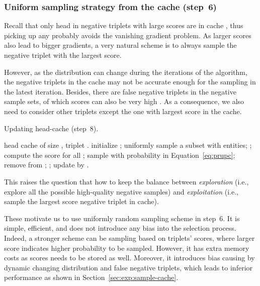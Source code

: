 \documentclass[conference]{IEEEtran}
\begin{document}
\subsubsection{Uniform sampling strategy from the cache (step~6)}
\label{sssec:sample}
Recall that only head  in negative triplets with large scores are in cache ,
thus picking up any  probably avoids the vanishing gradient problem.
As larger scores also lead to bigger gradients,
a very natural scheme is to always sample the negative triplet with the largest score.

However,
as the distribution can change during the iterations of the algorithm,
the negative triplets in the cache may not be accurate enough for the sampling in the latest iteration.
Besides,
there are false negative triplets in the negative sample sets,
of which scores can also be very high \cite{wang2017knowledge}.
As a consequence, 
we also need to consider other triplets except the one with largest score in the cache.


\begin{algorithm}[ht]
	\caption{Updating head-cache (step~8).}
	\label{alg-cache-update}
	\begin{algorithmic}[1]
		\REQUIRE  head cache  of size , triplet .
		\STATE initialize ;
		\STATE uniformly sample a subset  with  entities;
		\STATE ;
\STATE compute the score  for all ;
\FOR{}
			\STATE sample  with probability in Equation~\eqref{eq:prupc};
			\STATE remove  from ;
			\STATE ;
		\ENDFOR
		\STATE update by .
	\end{algorithmic}
\end{algorithm}

This raises the question that
how to keep the balance between \textit{exploration} 
(i.e., explore all the possible high-quality negative samples)
and \textit{exploitation} (i.e., sample the largest score negative triplet in cache).


These motivate us to use uniformly random sampling scheme in step~6.
It is simple, efficient,
and does not introduce any bias into the selection process.
Indeed,
a stronger scheme can be sampling based on triplets' scores,
where larger score indicates higher probability to be sampled.
However,
it has extra memory costs as scores needs to be stored as well.
Moreover,
it introduces bias causing by dynamic changing distribution and false negative triplets,
which leads to inferior performance as shown in Section~\ref{sec:exp:sample-cache}.
\end{document}

